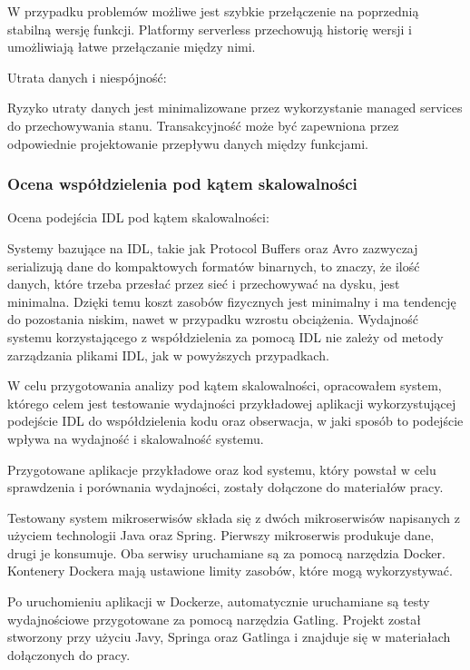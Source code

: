 \documentclass[runningheads,12pt]{llncs}
\begin{document}
W przypadku problemów możliwe jest szybkie przełączenie na poprzednią stabilną wersję funkcji. Platformy serverless przechowują historię wersji i umożliwiają łatwe przełączanie między nimi. ~\cite[p. 289]{roberts2018cloud}

Utrata danych i niespójność:

Ryzyko utraty danych jest minimalizowane przez wykorzystanie managed services do przechowywania stanu. Transakcyjność może być zapewniona przez odpowiednie projektowanie przepływu danych między funkcjami. ~\cite[p. 312]{roberts2018cloud}

\newpage
\subsubsection{Ocena współdzielenia pod kątem skalowalności}

Ocena podejścia IDL pod kątem skalowalności:

Systemy bazujące na IDL, takie jak Protocol Buffers oraz Avro zazwyczaj serializują dane do kompaktowych formatów binarnych, to znaczy, że ilość danych, które trzeba przesłać przez sieć i przechowywać na dysku, jest minimalna. Dzięki temu koszt zasobów fizycznych jest minimalny i ma tendencję do pozostania niskim, nawet w przypadku wzrostu obciążenia. Wydajność systemu korzystającego z współdzielenia za pomocą IDL nie zależy od metody zarządzania plikami IDL, jak w powyższych przypadkach.

W celu przygotowania analizy pod kątem skalowalności, opracowałem system, którego celem jest testowanie wydajności przykładowej aplikacji wykorzystującej podejście IDL do współdzielenia kodu oraz obserwacja, w jaki sposób to podejście wpływa na wydajność i skalowalność systemu.

Przygotowane aplikacje przykładowe oraz kod systemu, który powstał w celu sprawdzenia i porównania wydajności, zostały dołączone do materiałów pracy.

Testowany system mikroserwisów składa się z dwóch mikroserwisów napisanych z użyciem technologii Java oraz Spring. Pierwszy mikroserwis produkuje dane, drugi je konsumuje. Oba serwisy uruchamiane są za pomocą narzędzia Docker. Kontenery Dockera mają ustawione limity zasobów, które mogą wykorzystywać.

Po uruchomieniu aplikacji w Dockerze, automatycznie uruchamiane są testy wydajnościowe przygotowane za pomocą narzędzia Gatling. Projekt został stworzony przy użyciu Javy, Springa oraz Gatlinga i znajduje się w materiałach dołączonych do pracy.
\end{document}
